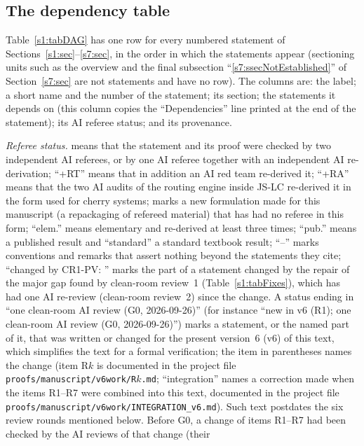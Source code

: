 \subsection{The dependency table}\label{s1:ssecDAG}

Table~\ref{s1:tabDAG} has one row for every numbered statement of
Sections~\ref{s1:sec}--\ref{s7:sec}, in the order in which the statements appear
(sectioning units such as the overview and the final subsection
``\ref{s7:ssecNotEstablished}'' of Section~\ref{s7:sec} are not statements and
have no row). The columns are: the label; a short name
and the number of the statement; its section; the statements it depends on
(this column copies the ``Dependencies'' line printed at the end of the statement); its
AI referee status; and its provenance.

\emph{Referee status.}  means that the statement and its proof were checked
by two independent AI referees, or by one AI referee together with an independent
AI re-derivation; ``+RT'' means that in addition an AI red team re-derived it;
``+RA'' means that the two AI audits of the routing engine inside JS-LC
re-derived it in the form used for cherry systems;  marks a new formulation
made for this manuscript (a repackaging of refereed material) that has had no
referee in this form; ``elem.'' means elementary and re-derived at least three
times; ``pub.'' means a published result and ``standard'' a standard textbook
result; ``--'' marks conventions and remarks that assert nothing beyond the
statements they cite; ``changed by \textsf{CR1-PV}: '' marks the part of a
statement changed by the repair of the major gap found by clean-room review~1
(Table~\ref{s1:tabFixes}), which has had one AI re-review (clean-room review~2)
since the change. A status ending in ``one clean-room AI review (G0,
2026-09-26)'' (for instance ``new in v6 (R1); one clean-room AI review (G0,
2026-09-26)'') marks a statement, or the named part of it, that was
written or changed for the present version~6 (v6) of this text, which
simplifies the text for a formal verification; the item in parentheses names
the change (item R$k$ is documented in the project file
\texttt{proofs/\allowbreak{}manuscript/\allowbreak{}v6work/\allowbreak{}R$k$.md};
``integration'' names a correction made when the items R1--R7 were combined
into this text, documented in the project file
\texttt{proofs/\allowbreak{}manuscript/\allowbreak{}v6work/\allowbreak{}INTEGRATION\_v6.md}).
Such text postdates the six review rounds mentioned below. Before G0, a
change of items R1--R7 had been checked by the AI reviews of that change (their
